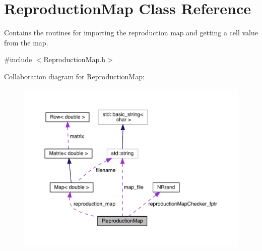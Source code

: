 \hypertarget{class_reproduction_map}{}\section{Reproduction\+Map Class Reference}
\label{class_reproduction_map}


Contains the routines for importing the reproduction map and getting a cell value from the map.  




{\ttfamily \#include $<$Reproduction\+Map.\+h$>$}



Collaboration diagram for Reproduction\+Map\+:
\nopagebreak
\begin{figure}[H]
\begin{center}
\leavevmode
\includegraphics[width=350pt]{class_reproduction_map__coll__graph}
\end{center}
\end{figure}
